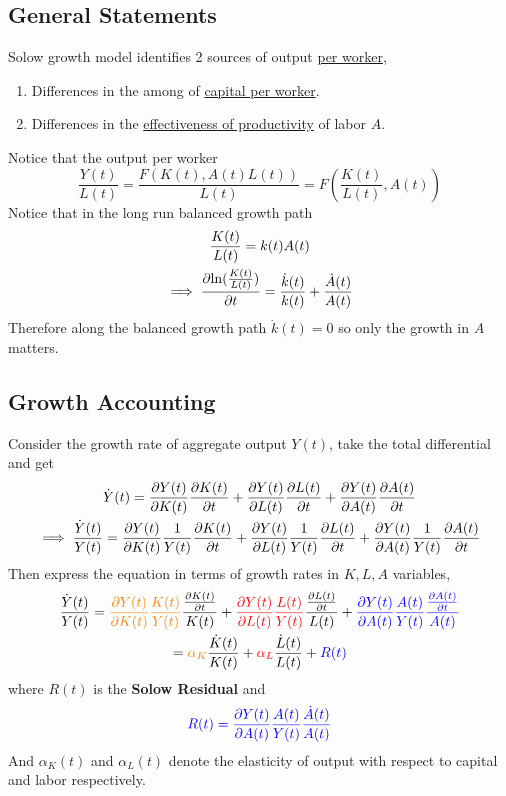 \documentclass[11pt]{article}
\begin{document}
	    \subsection{General Statements}
	    \par Solow growth model identifies 2 sources of output \ul{per worker},
	    \begin{enumerate}
	    	\item Differences in the among of \ul{capital per worker}.
	    	\item Differences in the \ul{effectiveness of productivity} of labor $A$.
	    \end{enumerate}
	    Notice that the output per worker 
	    \[
	    	\frac{Y(t)}{L(t)} = \frac{F(K(t), A(t)L(t))}{L(t)} = F(\frac{K(t)}{L(t)}, A(t))
	    \]
	    Notice that in the long run balanced growth path
	    \begin{gather*}
	    	\frac{K(t)}{L(t)} = k(t)A(t) \\
	    	\implies \frac{\partial{\ln(\frac{K(t)}{L(t)})}}{\partial{t}} = \frac{\dot{k}(t)}{k(t)} + \frac{\dot{A}(t)}{A(t)}
	    \end{gather*}
	    Therefore along the balanced growth path $\dot{k}(t) = 0$ so only the growth in $A$ matters.
	    
	    \subsection{Growth Accounting}
	    \par Consider the growth rate of aggregate output $Y(t)$, take the total differential and get
	    \begin{gather}
	    	\dot{Y}(t) = \frac{\partial{Y(t)}}{\partial{K(t)}} \frac{\partial{K(t)}}{\partial{t}} + \frac{\partial{Y(t)}}{\partial{L(t)}} \frac{\partial{L(t)}}{\partial{t}} + \frac{\partial{Y(t)}}{\partial{A(t	)}}\frac{\partial{A(t)}}{\partial{t}} \\
	    	\implies 
	    	\frac{\dot{Y}(t)}{Y(t)} = \frac{\partial{Y(t)}}{\partial{K(t)}} \frac{1}{Y(t)} \frac{\partial{K(t)}}{\partial{t}} + \frac{\partial{Y(t)}}{\partial{L(t)}} \frac{1}{Y(t)} \frac{\partial{L(t)}}{\partial{t}} + \frac{\partial{Y(t)}}{\partial{A(t)}} \frac{1}{Y(t)} \frac{\partial{A(t)}}{\partial{t}} 
	    \end{gather}
	    Then express the equation in terms of growth rates in $K, L, A$ variables,
	    \begin{gather}
	    	\frac{\dot{Y}(t)}{Y(t)} = \textcolor{orange}{\frac{\partial{Y(t)}}{\partial{K(t)}} \frac{K(t)}{Y(t)}}\frac{\frac{\partial{K(t)}}{\partial{t}}}{K(t)} 
	    	+ \textcolor{red}{\frac{\partial{Y(t)}}{\partial{L(t)}} \frac{L(t)}{Y(t)}} \frac{\frac{\partial{L(t)}}{\partial{t}}}{L(t)} 
	    	+ \textcolor{blue}{\frac{\partial{Y(t)}}{\partial{A(t)}} \frac{A(t)}{Y(t)} \frac{\frac{\partial{A(t)}}{\partial{t}}}{A(t)}}
	    	\\
	    	= \textcolor{orange}{\alpha_K} \frac{\dot{K}(t)}{K(t)} 
	    	+ \textcolor{red}{\alpha_L} \frac{\dot{L}(t)}{L(t)} 
	    	+ \textcolor{blue}{R(t)}
	    \end{gather}
	    where $R(t)$ is the \textbf{Solow Residual} and 
	    \begin{equation}
	    	\textcolor{blue}{R(t) = \frac{\partial{Y(t)}}{\partial{A(t)}} \frac{A(t)}{Y(t)} \frac{\dot{A}(t)}{A(t)}}
	    \end{equation}
	    And $\alpha_K(t)$ and $\alpha_L(t)$ denote the elasticity of output with respect to capital and labor respectively.
	    
\end{document}
